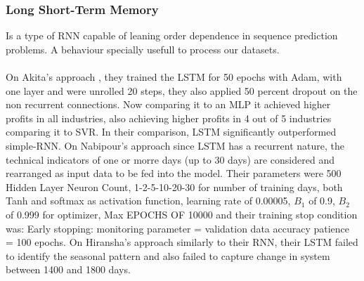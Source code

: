 \documentclass[conference]{IEEEtran}
\begin{document}
\subsubsection{Long Short-Term Memory}
Is a type of RNN capable of leaning order dependence in sequence prediction problems. A behaviour specially usefull to process our datasets. 
\\\\
On Akita's approach \cite{Akita2016}, they trained the LSTM for 50 epochs with Adam, with one layer and were unrolled 20 steps, they also applied 50 percent dropout on the non recurrent connections.
Now comparing it to an MLP it achieved higher profits in all industries, also achieving higher profits in 4 out of 5 industries comparing it to SVR. In their comparison, LSTM significantly outperformed simple-RNN.
On Nabipour's approach \cite{nabipour2020predicting} since LSTM has a recurrent nature, the technical indicators of one or morre days (up to 30 days) are considered and rearranged as input data to be fed into the model. Their parameters were 500 Hidden Layer Neuron Count, 1-2-5-10-20-30 for number of training days, both Tanh and softmax as activation function, learning rate of 0.00005, $B_1$ of 0.9, $B_2$ of 0.999 for optimizer, Max EPOCHS OF 10000 and their training stop condition
was: Early stopping: monitoring parameter = validation data accuracy patience = 100 epochs.
On Hiransha's approach \cite{M2018} similarly to their RNN, their LSTM failed to identify the seasonal pattern and also failed to capture change in system between 1400 and 1800 days.
\\\\
\end{document}
